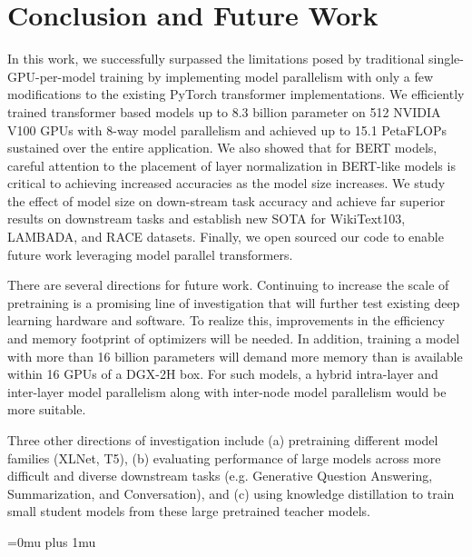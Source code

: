 \section{Conclusion and Future Work}

In this work, we successfully surpassed the limitations posed by traditional single-GPU-per-model training by implementing model parallelism with only a few modifications to the existing PyTorch transformer implementations. We efficiently trained transformer based models up to 8.3 billion parameter on 512 NVIDIA V100 GPUs with 8-way model parallelism and achieved up to 15.1 PetaFLOPs sustained over the entire application. We also showed that for BERT models, careful attention to the placement of layer normalization in BERT-like models is critical to achieving increased accuracies as the model size increases. We study the effect of model size on down-stream task accuracy and achieve far superior results on downstream tasks and establish new SOTA for WikiText103, LAMBADA, and RACE datasets. Finally, we open sourced our code to enable future work leveraging model parallel transformers.

There are several directions for future work. Continuing to increase the scale of pretraining is a promising line of investigation that will further test existing deep learning hardware and software. To realize this, improvements in the efficiency and memory footprint of optimizers will be needed. In addition, training a model with more than 16 billion parameters will demand more memory than is available within 16 GPUs of a DGX-2H box. For such models, a hybrid intra-layer and inter-layer model parallelism along with inter-node model parallelism would be more suitable.

Three other directions of investigation include (a) pretraining different model families (XLNet, T5), (b) evaluating performance of large models across more difficult and diverse downstream tasks (e.g. Generative Question Answering, Summarization, and Conversation), and (c) using knowledge distillation to train small student models from these large pretrained teacher models.

\Urlmuskip=0mu plus 1mu\relax


